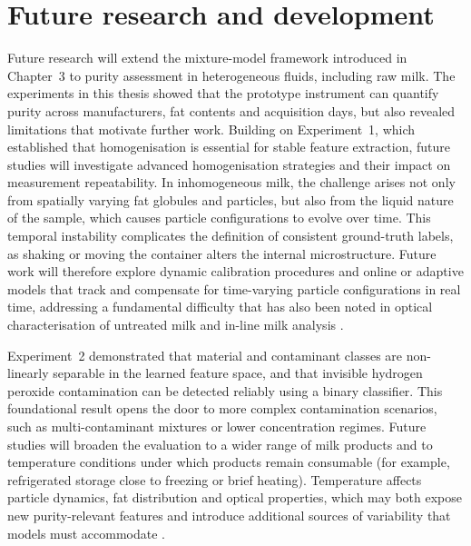 \documentclass[12pt,a4paper,oneside]{report}
\let\oldsection\section
\renewcommand{\section}{\clearpage\oldsection}
\begin{document}
\newpage
\section{Future research and development}
\label{sec:future_research_development_chapter6}
\noindent
Future research will extend the mixture-model framework introduced in Chapter~3 to purity assessment in heterogeneous fluids, including raw milk. The experiments in this thesis showed that the prototype instrument can quantify purity across manufacturers, fat contents and acquisition days, but also revealed limitations that motivate further work. Building on Experiment~1, which established that homogenisation is essential for stable feature extraction, future studies will investigate advanced homogenisation strategies and their impact on measurement repeatability. In inhomogeneous milk, the challenge arises not only from spatially varying fat globules and particles, but also from the liquid nature of the sample, which causes particle configurations to evolve over time. This temporal instability complicates the definition of consistent ground-truth labels, as shaking or moving the container alters the internal microstructure. Future work will therefore explore dynamic calibration procedures and online or adaptive models that track and compensate for time-varying particle configurations in real time, addressing a fundamental difficulty that has also been noted in optical characterisation of untreated milk and in-line milk analysis \cite{aernouts2015,melfsen2012,walstra1999}.

Experiment~2 demonstrated that material and contaminant classes are non-linearly separable in the learned feature space, and that invisible hydrogen peroxide contamination can be detected reliably using a binary classifier. This foundational result opens the door to more complex contamination scenarios, such as multi-contaminant mixtures or lower concentration regimes. Future studies will broaden the evaluation to a wider range of milk products and to temperature conditions under which products remain consumable (for example, refrigerated storage close to freezing or brief heating). Temperature affects particle dynamics, fat distribution and optical properties, which may both expose new purity-relevant features and introduce additional sources of variability that models must accommodate \cite{lott2023,burgwald1947}.
\end{document}
